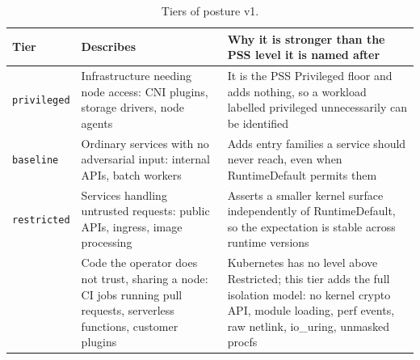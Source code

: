 \begin{table}[htbp]
\centering\small
\begin{tabularx}{\textwidth}{@{}P{3.3cm}P{4.6cm}L@{}}
\toprule
\textbf{Tier} & \textbf{Describes} & \textbf{Why it is stronger than the PSS level it is named after} \\
\midrule
\texttt{privileged} & Infrastructure needing node access: CNI plugins, storage drivers, node agents & It is the PSS Privileged floor and adds nothing, so a workload labelled privileged unnecessarily can be identified \\
\texttt{baseline} & Ordinary services with no adversarial input: internal APIs, batch workers & Adds entry families a service should never reach, even when RuntimeDefault permits them \\
\texttt{restricted} & Services handling untrusted requests: public APIs, ingress, image processing & Asserts a smaller kernel surface independently of RuntimeDefault, so the expectation is stable across runtime versions \\
 & Code the operator does not trust, sharing a node: CI jobs running pull requests, serverless functions, customer plugins & Kubernetes has no level above Restricted; this tier adds the full isolation model: no kernel crypto API, module loading, perf events, raw netlink, io\_uring, unmasked procfs \\
\bottomrule
\end{tabularx}
\caption{Tiers of posture v1.}
\label{tab:tiers}
\end{table}

